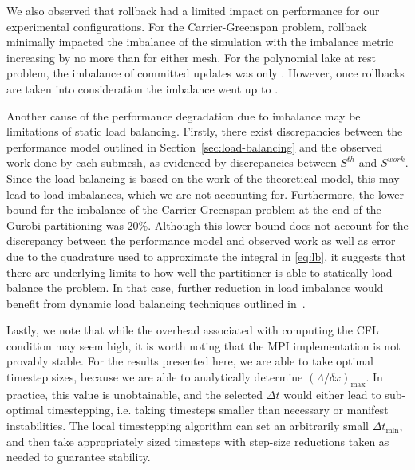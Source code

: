 We also observed that rollback had a limited impact on performance for our experimental configurations.  For the Carrier-Greenspan problem, rollback minimally impacted the imbalance of the simulation with the imbalance metric increasing by no more than \imbCGdtRb{} for either mesh. For the polynomial lake at rest problem, the imbalance of committed updates was only \polynomialImb . However, once rollbacks are taken into consideration the imbalance went up to \polynomialImbwRb . 

Another cause of the performance degradation due to imbalance may be limitations of static load balancing. Firstly, there exist discrepancies between the performance model outlined in Section~\ref{sec:load-balancing} and the observed work done by each submesh, as evidenced by discrepancies between $S^{th}$ and $S^{work}$. Since the load balancing is based on the work of the theoretical model, this may lead to load imbalances, which we are not accounting for. Furthermore, the lower bound for the imbalance of the Carrier-Greenspan problem at the end of the Gurobi partitioning was 20\%. Although this lower bound does not account for the discrepancy between the performance model and observed work as well as error due to the quadrature used to approximate the integral in \eqref{eq:lb}, it suggests that there are underlying limits to how well the partitioner is able to statically load balance the problem. In that case, further reduction in load imbalance would benefit from dynamic load balancing techniques outlined in~\cite{Bremer2018}.

Lastly, we note that while the overhead associated with computing the CFL condition may seem high, it is worth noting that the MPI implementation is not provably stable. For the results presented here, we are able to take optimal timestep sizes, because we are able to analytically determine $(\Lambda / \delta x)_{\max}$. In practice, this value is unobtainable, and the selected $\Delta t$ would either lead to sub-optimal timestepping, i.e. taking timesteps smaller than necessary or manifest instabilities. The local timestepping algorithm can set an arbitrarily small $\Delta t_{\min}$,  and then take appropriately sized timesteps with step-size reductions taken as needed to guarantee stability.

